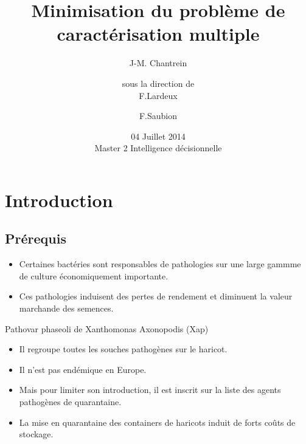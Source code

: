 \documentclass{beamer}
\title{Minimisation du problème de caractérisation multiple}
\author{
J-M. Chantrein\\
\and
sous la direction de\\
F.Lardeux
\and
F.Saubion
}
\institute{LERIA}
\date{04 Juillet 2014 \\ \vspace{0.5cm}\large{Master 2 Intelligence décisionnelle}}
\begin{document}
\begin{frame}
\titlepage 
\end{frame}




\section*{Introduction}
\subsection*{Prérequis}
\begin{frame}{}

\begin{block}{}
	\begin{itemize}
		\item Certaines bactéries sont responsables de pathologies sur une large gammme de culture économiquement importante.
		\pause
		\item Ces pathologies induisent des pertes de rendement et diminuent la valeur marchande des semences. 
	\end{itemize}
\end{block}

\pause
\begin{exampleblock}{Pathovar phaseoli de Xanthomonas Axonopodis (Xap)}
	\begin{itemize}
		\item Il regroupe toutes les souches pathogènes sur le haricot.
		\pause
		\item Il n'est pas endémique en Europe.
		\pause
		\item Mais pour limiter son introduction, il est inscrit sur la liste des agents pathogènes de quarantaine.
		\pause
		\item La mise en quarantaine des containers de haricots induit de forts coûts de stockage.
	\end{itemize}
\end{exampleblock}
\end{frame}
\end{document}
